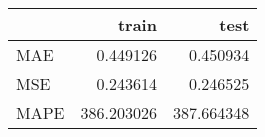 \begin{tabular}{lrr}
\toprule
{} &       train &        test \\
\midrule
MAE  &    0.449126 &    0.450934 \\
MSE  &    0.243614 &    0.246525 \\
MAPE &  386.203026 &  387.664348 \\
\bottomrule
\end{tabular}

